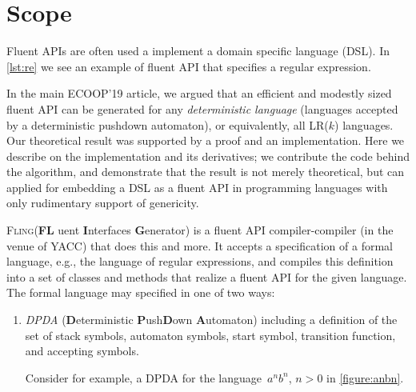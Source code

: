 \documentclass[a4paper,UKenglish,cleveref, autoref]{darts-v2019}
\newcommand{\Fling}{F\textsc{ling}\xspace}
\newenvironment{scope}{\section{Scope}}{}
\begin{document}
\begin{scope}
Fluent APIs are often used a implement a domain specific language (DSL). In
\cref{lst:re} we see an example of fluent API that specifies
a regular expression.
In the main ECOOP'19 article, we argued that an efficient and modestly sized
fluent API can be generated for any \emph{deterministic language} (languages
accepted by a deterministic pushdown automaton), or equivalently, all LR($k$)
languages. Our theoretical result
was supported by a proof and an implementation. Here we describe
on the implementation and its derivatives; we contribute the code
behind the algorithm, and demonstrate that the result is not merely
theoretical, but can applied for embedding a DSL as a fluent API
in programming languages with only rudimentary support of genericity.

\Fling (\textbf F\textbf L uent \textbf Interfaces \textbf Generator) is a
fluent API compiler-compiler (in the venue of YACC) that does this and more.
It accepts a specification of a formal language, e.g., the language of
regular expressions,
and compiles this definition into a set of classes and methods that
realize a fluent API for the given language. The formal language may specified in one of two ways:
\begin{enumerate}
  \item \emph{DPDA} (\textbf Deterministic \textbf Push\textbf Down \textbf
    Automaton) including a definition of the set of stack symbols, automaton
    symbols, start symbol, transition function, and accepting symbols.

    Consider for example, a DPDA for the language~$a^{n}b^{n}$, $n>0$ in \cref{figure:anbn}. 


\end{enumerate}
\end{scope}
\end{document}

